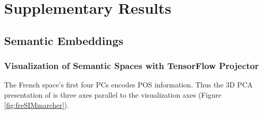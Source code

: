 \chapter{Supplementary Results} %
\label{app:suppresults}
\section{Semantic Embeddings}
\subsection{Visualization of Semantic Spaces with TensorFlow Projector}
\label{appsubsec:projectorvisu}

The French  space's first four PCs encodes POS information. Thus the 3D PCA presentation of  is three axes parallel to the visualization axes (Figure \ref{fig:freSIMmarcher}). 
